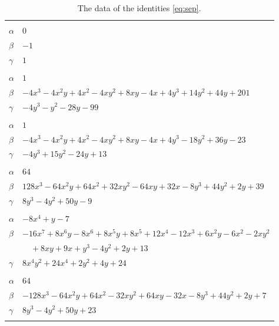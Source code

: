 \documentclass[11pt]{article}
\begin{document}
\begingroup\footnotesize
\setlength{\LTcapwidth}{\textwidth}
\begin{longtable}{@{}ll@{}}
\caption{The data of the identities \eqref{eq:sep}.}\label{tab:sep}\\
\hline\endfirsthead\hline\endhead\hline\endfoot
\multicolumn{2}{@{}l}{$\{i,j\}=\{0,1\}$, $k_{ij}=1$}\\
$\alpha$ & $0$\\
$\beta$ & $-1$\\
$\gamma$ & $1$\\
\addlinespace[3pt]
\multicolumn{2}{@{}l}{$\{i,j\}=\{1,5\}$, $k_{ij}=2^{4}\cdot 5^{2}$}\\
$\alpha$ & $1$\\
$\beta$ & $-4x^{3}-4x^{2}y+4x^{2}-4xy^{2}+8xy-4x+4y^{3}+14y^{2}+44y+201$\\
$\gamma$ & $-4y^{3}-y^{2}-28y-99$\\
\addlinespace[3pt]
\multicolumn{2}{@{}l}{$\{i,j\}=\{1,6\}$, $k_{ij}=2^{2}$}\\
$\alpha$ & $1$\\
$\beta$ & $-4x^{3}-4x^{2}y+4x^{2}-4xy^{2}+8xy-4x+4y^{3}-18y^{2}+36y-23$\\
$\gamma$ & $-4y^{3}+15y^{2}-24y+13$\\
\addlinespace[3pt]
\multicolumn{2}{@{}l}{$\{i,j\}=\{2,5\}$, $k_{ij}=11^{2}$}\\
$\alpha$ & $64$\\
$\beta$ & $128x^{3}-64x^{2}y+64x^{2}+32xy^{2}-64xy+32x-8y^{3}+44y^{2}+2y+39$\\
$\gamma$ & $8y^{3}-4y^{2}+50y-9$\\
\addlinespace[3pt]
\multicolumn{2}{@{}l}{$\{i,j\}=\{2,7\}$, $k_{ij}=2\cdot 3$}\\
$\alpha$ & $-8x^{4}+y-7$\\
$\beta$ & $-16x^{7}+8x^{6}y-8x^{6}+8x^{5}y+8x^{5}+12x^{4}-12x^{3}+6x^{2}y-6x^{2}-2xy^{2}$\\
 & $\quad +8xy+9x+y^{3}-4y^{2}+2y+13$\\
$\gamma$ & $8x^{4}y^{2}+24x^{4}+2y^{2}+4y+24$\\
\addlinespace[3pt]
\multicolumn{2}{@{}l}{$\{i,j\}=\{3,4\}$, $k_{ij}=5^{2}$}\\
$\alpha$ & $64$\\
$\beta$ & $-128x^{3}-64x^{2}y+64x^{2}-32xy^{2}+64xy-32x-8y^{3}+44y^{2}+2y+7$\\
$\gamma$ & $8y^{3}-4y^{2}+50y+23$\\
\addlinespace[3pt]
\multicolumn{2}{@{}l}{$\{i,j\}=\{3,7\}$, $k_{ij}=2\cdot 11^{2}$}\\

\end{longtable}
\end{document}
